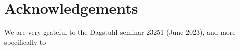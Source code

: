 
\section*{Acknowledgements}
We are very grateful to the Dagstuhl seminar 23251 (June 2023), and more specifically to 




